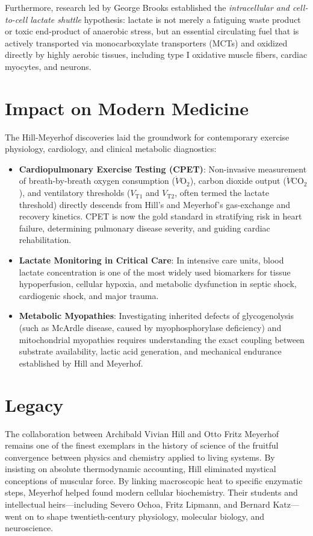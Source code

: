 Furthermore, research led by George Brooks established the \emph{intracellular and cell-to-cell lactate shuttle} hypothesis: lactate is not merely a fatiguing waste product or toxic end-product of anaerobic stress, but an essential circulating fuel that is actively transported via monocarboxylate transporters (MCTs) and oxidized directly by highly aerobic tissues, including type I oxidative muscle fibers, cardiac myocytes, and neurons.

\section{Impact on Modern Medicine}

The Hill-Meyerhof discoveries laid the groundwork for contemporary exercise physiology, cardiology, and clinical metabolic diagnostics:
\begin{itemize}
    \item \textbf{Cardiopulmonary Exercise Testing (CPET)}: Non-invasive measurement of breath-by-breath oxygen consumption ($\dot{V}\text{O}_2$), carbon dioxide output ($\dot{V}\text{CO}_2$), and ventilatory thresholds ($V_{\text{T}1}$ and $V_{\text{T}2}$, often termed the lactate threshold) directly descends from Hill's and Meyerhof's gas-exchange and recovery kinetics. CPET is now the gold standard in stratifying risk in heart failure, determining pulmonary disease severity, and guiding cardiac rehabilitation.
    \item \textbf{Lactate Monitoring in Critical Care}: In intensive care units, blood lactate concentration is one of the most widely used biomarkers for tissue hypoperfusion, cellular hypoxia, and metabolic dysfunction in septic shock, cardiogenic shock, and major trauma.
    \item \textbf{Metabolic Myopathies}: Investigating inherited defects of glycogenolysis (such as McArdle disease, caused by myophosphorylase deficiency) and mitochondrial myopathies requires understanding the exact coupling between substrate availability, lactic acid generation, and mechanical endurance established by Hill and Meyerhof.
\end{itemize}

\section{Legacy}

The collaboration between Archibald Vivian Hill and Otto Fritz Meyerhof remains one of the finest exemplars in the history of science of the fruitful convergence between physics and chemistry applied to living systems. By insisting on absolute thermodynamic accounting, Hill eliminated mystical conceptions of muscular force. By linking macroscopic heat to specific enzymatic steps, Meyerhof helped found modern cellular biochemistry. Their students and intellectual heirs—including Severo Ochoa, Fritz Lipmann, and Bernard Katz—went on to shape twentieth-century physiology, molecular biology, and neuroscience.


